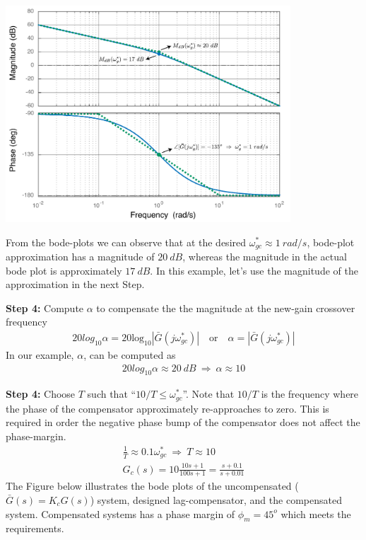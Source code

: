 \documentclass[twoside]{article}
\begin{document}
     \begin{center}
 \begin{minipage}[h]{\linewidth}
     \begin{center}
       \includegraphics[width=0.8\textwidth]{laggaincross}
     \end{center}
 \end{minipage}
     \end{center}
     
From the bode-plots we can observe that 
at the desired  $\omega_{gc}^* \approx 1 \ rad/s$,
bode-plot approximation has a magnitude of
$20 \ dB$, whereas the magnitude in the actual
bode plot is approximately $17 \ dB$. In this example,
let's use the magnitude of the approximation in the
next Step.

\textbf{Step 4:} Compute $\alpha$ to compensate the 
the magnitude at the new-gain crossover frequency
%
\begin{align*} 
  20 log_{10} \alpha =  20 \mathrm{log}_{10} |\bar{G}(j  \omega_{gc}^*) |
  	\quad \mathrm{or} \quad
     \alpha = | \bar{G}(j  \omega_{gc}^*) |
\end{align*}
%
In our example, $\alpha$, can be computed as
%
\begin{align*} 
	20 log_{10} \alpha \approx 20 \ dB
	\ \Rightarrow \ \alpha \approx 10
\end{align*}
%

\textbf{Step 4:} Choose $T$ such that ``$10/T \leq \omega_{gc}^*$''.
Note that $10/T$ is the frequency where the phase of the compensator
approximately re-approaches to zero.
This is required in order the
          negative phase bump of the compensator does not affect the
          phase-margin. 
%
\begin{align*} 
	\frac{1}{T} \approx 0.1 \omega_{gc}^*
		\ \Rightarrow \ T \approx 10
		\\	
G_c(s) = 10 \frac{10 s + 1}{100 s + 1} = \frac{s + 0.1}{s + 0.01}
\end{align*}
%
The Figure below illustrates the bode plots of 
the uncompensated ($\bar{G}(s) = K_c G(s)$) system,
designed lag-compensator, and the compensated system. 
Compensated systems has a phase margin of $\phi_m = 45^o$
which meets the requirements.
\end{document}
